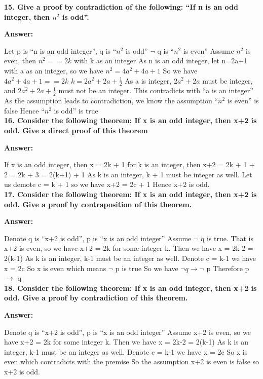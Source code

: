 \documentclass{article}
\begin{document}
\begin{large}
\textbf{15. Give a proof by contradiction of the following: ``If n is an odd integer, then $n^2$ is odd''.}

\textbf{Answer:}

Let p is ``n is an odd integer'', q is ``$n^2$ is odd''
$\lnot$ q is ``$n^2$ is even''
Assume $n^2$ is even, then $n^2 == 2k$ with k as an integer
As n is an odd integer, let n=2a+1 with a as an integer, so we have $n^2 = 4a^2 + 4a + 1$
So we have $4a^2 + 4a + 1 == 2k$
$k = 2a^2 + 2a + \frac{1}{2}$
As a is integer, $2a^2 + 2a$ must be integer, and $2a^2 + 2a + \frac{1}{2}$ must not be an integer.
This contradicts with ``a is an integer''
As the assumption leads to contradiction, we know the assumption ``$n^2$ is even'' is false
Hence ``$n^2$ is odd'' is true\\

\textbf{16. Consider the following theorem: If x is an odd integer, then x+2 is odd. Give a direct proof of this theorem}

\textbf{Answer:}

If x is an odd integer, then x = 2k + 1 for k is an integer, then x+2 = 2k + 1 + 2 = 2k + 3 = 2(k+1) + 1
As k is an integer, k + 1 must be integer as well. Let us demote c = k + 1 so we have x+2 = 2c + 1
Hence x+2 is odd.\\

\textbf{17. Consider the following theorem: If x is an odd integer, then x+2 is odd. Give a proof by contraposition of this theorem.}

\textbf{Answer:}

Denote q is ``x+2 is odd'', p is ``x is an odd integer''
Assume $\lnot$ q is true. That is x+2 is even, so we have x+2 = 2k for some integer k.
Then we have x = 2k-2 = 2(k-1)
As k is an integer, k-1 must be an integer as well. Denote c = k-1 we have x = 2c
So x is even which means $\lnot$ p is true
So we have $\lnot q \to \lnot$ p
Therefore p $\to$ q\\

\textbf{18. Consider the following theorem: If x is an odd integer, then x+2 is odd. Give a proof by contradiction of this theorem.}

\textbf{Answer:}

Denote q is ``x+2 is odd'', p is ``x is an odd integer''
Assume x+2 is even, so we have x+2 = 2k for some integer k.
Then we have x = 2k-2 = 2(k-1)
As k is an integer, k-1 must be an integer as well. Denote c = k-1 we have x = 2c
So x is even which contradicts with the premise
So the assumption x+2 is even is false so x+2 is odd.\\


\end{large}
\end{document}
